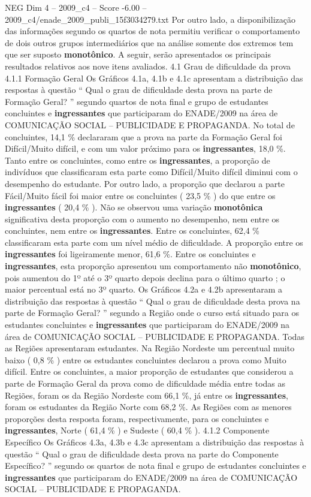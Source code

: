 \begin{textsample}{NEG Dim 4 – 2009\_c4 – Score -6.00 – 2009\_c4/enade\_2009\_publi\_15f3034279.txt}
Por outro lado, a disponibilização das informações segundo os quartos de nota permitiu verificar o comportamento de dois outros grupos intermediários que na análise somente dos extremos tem que ser suposto \textbf{monotônico}.
A seguir, serão apresentados os principais resultados relativos aos nove itens avaliados. 4.1 Grau de dificuldade da prova 4.1.1 Formação Geral Os Gráficos 4.1a, 4.1b e 4.1c apresentam a distribuição das respostas à questão “ Qual o grau de dificuldade desta prova na parte de Formação Geral? ” segundo quartos de nota final e grupo de estudantes concluintes e \textbf{ingressantes} que participaram do ENADE/2009 na área de COMUNICAÇÃO SOCIAL – PUBLICIDADE E PROPAGANDA.
No total de concluintes, 14,1 \% declararam que a prova na parte da Formação Geral foi Difícil/Muito difícil, e com um valor próximo para os \textbf{ingressantes}, 18,0 \%.
Tanto entre os concluintes, como entre os \textbf{ingressantes}, a proporção de indivíduos que classificaram esta parte como Difícil/Muito difícil diminui com o desempenho do estudante.
Por outro lado, a proporção que declarou a parte Fácil/Muito fácil foi maior entre os concluintes ( 23,5 \% ) do que entre os \textbf{ingressantes} ( 20,4 \% ).
Não se observou uma variação \textbf{monotônica} significativa desta proporção com o aumento no desempenho, nem entre os concluintes, nem entre os \textbf{ingressantes}.
Entre os concluintes, 62,4 \% classificaram esta parte com um nível médio de dificuldade.
A proporção entre os \textbf{ingressantes} foi ligeiramente menor, 61,6 \%.
Entre os concluintes e \textbf{ingressantes}, esta proporção apresentou um comportamento não \textbf{monotônico}, pois aumentou do 1º até o 3º quarto depois declina para o último quarto ; o maior percentual está no 3º quarto.
Os Gráficos 4.2a e 4.2b apresentaram a distribuição das respostas à questão “ Qual o grau de dificuldade desta prova na parte de Formação Geral? ” segundo a Região onde o curso está situado para os estudantes concluintes e \textbf{ingressantes} que participaram do ENADE/2009 na área de COMUNICAÇÃO SOCIAL – PUBLICIDADE E PROPAGANDA.
Todas as Regiões apresentaram estudantes.
Na Região Nordeste um percentual muito baixo ( 0,8 \% ) entre os estudantes concluintes declarou a prova como Muito difícil.
Entre os concluintes, a maior proporção de estudantes que considerou a parte de Formação Geral da prova como de dificuldade média entre todas as Regiões, foram os da Região Nordeste com 66,1 \%, já entre os \textbf{ingressantes}, foram os estudantes da Região Norte com 68,2 \%.
As Regiões com as menores proporções desta resposta foram, respectivamente, para os concluintes e \textbf{ingressantes}, Norte ( 61,4 \% ) e Sudeste ( 60,4 \% ). 4.1.2 Componente Específico Os Gráficos 4.3a, 4.3b e 4.3c apresentam a distribuição das respostas à questão “ Qual o grau de dificuldade desta prova na parte do Componente Específico? ” segundo os quartos de nota final e grupo de estudantes concluintes e \textbf{ingressantes} que participaram do ENADE/2009 na área de COMUNICAÇÃO SOCIAL – PUBLICIDADE E PROPAGANDA.

\end{textsample}

